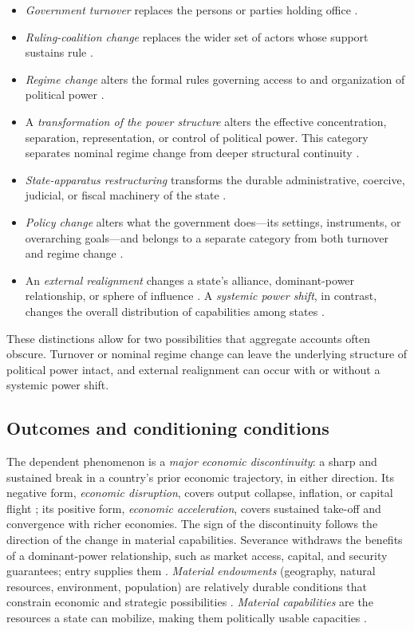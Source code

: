 \documentclass[11pt]{article}
\begin{document}
\begin{itemize}
	\item \emph{Government turnover} replaces the persons or parties holding office \parencite{bueno_de_mesquita_2003}.
	\item \emph{Ruling-coalition change} replaces the wider set of actors whose support sustains rule \parencite{bueno_de_mesquita_2003}.
	\item \emph{Regime change} alters the formal rules governing access to and organization of political power \parencite{linz_stepan_1996}. 
	\item A \emph{transformation of the power structure} alters the effective concentration, separation, representation, or control of political power. This category separates nominal regime change from deeper structural continuity \parencite{garciatrevijano2010}.
	\item \emph{State-apparatus restructuring} transforms the durable administrative, coercive, judicial, or fiscal machinery of the state \parencite{skocpol_1979,althusser_1971}. 
	\item \emph{Policy change} alters what the government does---its settings, instruments, or overarching goals---and belongs to a separate category from both turnover and regime change \parencite{hall_1993}.
	\item An \emph{external realignment} changes a state's alliance, dominant-power relationship, or sphere of influence \parencite{walt_1987}. A \emph{systemic power shift}, in contrast, changes the overall distribution of capabilities among states \parencite{gilpin_1981,waltz_1979}.
\end{itemize}

These distinctions allow for two possibilities that aggregate accounts often obscure. Turnover or nominal regime change can leave the underlying structure of political power intact, and external realignment can occur with or without a systemic power shift.

\subsection{Outcomes and conditioning conditions}

The dependent phenomenon is a \emph{major economic discontinuity}: a sharp and sustained break in a country's prior economic trajectory, in either direction. Its negative form, \emph{economic disruption}, covers output collapse, inflation, or capital flight \parencite{rodrik_1999}; its positive form, \emph{economic acceleration}, covers sustained take-off and convergence with richer economies. The sign of the discontinuity follows the direction of the change in material capabilities. Severance withdraws the benefits of a dominant-power relationship, such as market access, capital, and security guarantees; entry supplies them \parencite{lake_2009,gilpin_1981}. \emph{Material endowments} (geography, natural resources, environment, population) are relatively durable conditions that constrain economic and strategic possibilities \parencite{diamond_1997}. \emph{Material capabilities} are the resources a state can mobilize, making them politically usable capacities \parencite{mearsheimer_2001}.
\end{document}
